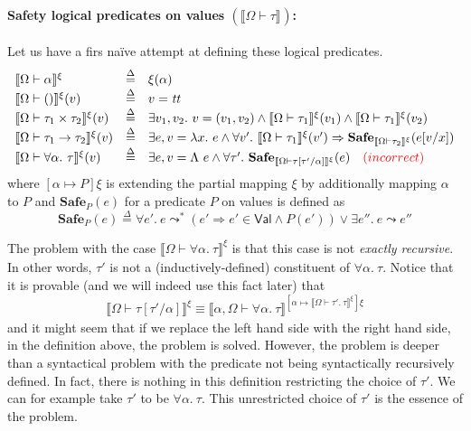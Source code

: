 \documentclass{article}
\newcommand{\TT}{\mathit{tt}}
\newcommand{\VAL}{\mathsf{Val}}
\newcommand{\UNT}{()}
\newcommand{\defeq}{\overset{\Delta}{=}}
\newcommand{\semtyp}[2]{\llbracket #2 \rrbracket_{#1}}
\begin{document}
\paragraph{Safety logical predicates on values $\left(\semtyp{}{\Omega \vdash \tau}\right)$:}
Let us have a firs na\"ive attempt at defining these logical
predicates.
\[
\begin{array}{lll}
\semtyp{}{\Omega \vdash \alpha}^{\xi} &\defeq& \xi(\alpha)\\
\semtyp{}{\Omega \vdash \UNT}^{\xi}(v) &\defeq& v = \TT\\
\semtyp{}{\Omega \vdash \tau_1 \times \tau_2}^{\xi}(v) &\defeq& \exists v_1, v_2.~v = (v_1, v_2) \land
\semtyp{}{\Omega \vdash \tau_1}^{\xi}(v_1) \land \semtyp{}{\Omega \vdash \tau_1}^{\xi}(v_2)\\
\semtyp{}{\Omega \vdash \tau_1 \to \tau_2}^{\xi}(v) &\defeq& \exists e, v = \lambda x.~e\land
\forall v'.~\semtyp{}{\Omega \vdash \tau_1}^{\xi}(v') \Rightarrow \mathbf{Safe}_{\semtyp{}{\Omega \vdash \tau_2}^{\xi}}(e[v/x])\\
\semtyp{}{\Omega \vdash \forall \alpha.~\tau}^{\xi}(v) &\defeq& \exists e, v = \Lambda~e\land
\forall \tau'.~\mathbf{Safe}_{\semtyp{}{\Omega \vdash \tau[\tau'/\alpha]}^{\xi}}(e) \hspace{1em} {\color{red}(incorrect)}
\end{array}
\]
where $[\alpha \mapsto P]\xi$ is extending the partial mapping $\xi$ by additionally mapping $\alpha$ to $P$ and $\mathbf{Safe}_{P}(e)$ for a predicate $P$ on values is defined as
\[
\mathbf{Safe}_{P}(e) \defeq \forall e'.~ e \leadsto^* (e'
\Rightarrow e' \in \VAL \land P(e')) \lor \exists e''.~e\leadsto e''
\]

The problem with the case $\semtyp{}{\Omega \vdash \forall \alpha.~\tau}^{\xi}$ is that this case is not \emph{exactly recursive}.
In other words, $\tau'$ is not a (inductively-defined)
constituent of $\forall \alpha.~\tau$.
Notice that it is provable (and we will indeed use this fact later)
that
\[
\semtyp{}{\Omega \vdash \tau[\tau'/\alpha]}^{\xi}
\equiv
\semtyp{}{\alpha, \Omega \vdash \forall \alpha.~\tau}^
{[\alpha \mapsto \semtyp{}{\Omega \vdash \tau'.~\tau}^{\xi}]\xi}
\]
and it might seem that if we replace the left hand side with
the right hand side, in the definition above, the problem is solved.
However, the problem is deeper than a syntactical problem with
the predicate not being syntactically recursively defined.
In fact, there is nothing in this definition restricting the choice of
$\tau'$. We can for example take $\tau'$ to be $\forall \alpha.~\tau$. This unrestricted choice of $\tau'$ is the essence of the problem.
\end{document}
